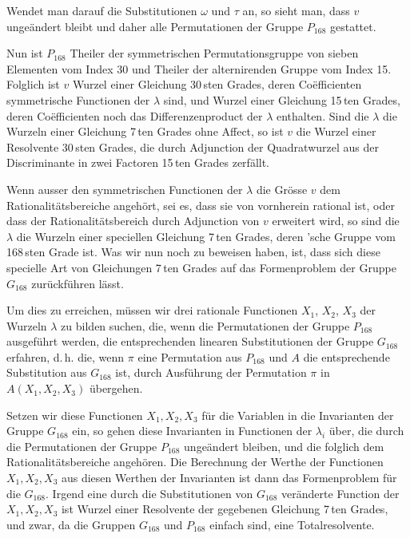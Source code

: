Wendet man darauf die Substitutionen $\omega$ und $\tau$ an, so sieht man, dass $v$ ungeändert bleibt und daher alle Permutationen der Gruppe $P_{168}$ gestattet.

Nun ist $P_{168}$ Theiler der symmetrischen Permutationsgruppe von sieben Elementen vom Index 30 und Theiler der alterniren\-den Gruppe vom Index 15. Folglich ist $v$ Wurzel einer Gleichung 30\,sten Grades, deren Co\"efficienten symmetrische Functionen der $\lambda$ sind, und Wurzel einer Gleichung 15\,ten Grades, deren Co\"efficienten noch das Differenzenproduct der $\lambda$ enthalten. Sind die $\lambda$ die Wurzeln einer Gleichung 7\,ten Grades ohne Affect, so ist $v$ die Wurzel einer Resolvente 30\,sten Grades, die durch Adjunction der Quadratwurzel aus der Discriminante in zwei Factoren 15\,ten Grades zerfällt.

Wenn ausser den symmetrischen Functionen der $\lambda$ die Grösse $v$ dem Rationalitätsbereiche angehört, sei es, dass sie von vornherein rational ist, oder dass der Rationalitätsbereich durch Adjunction von $v$ erweitert wird, so sind die $\lambda$ die Wurzeln einer speciellen Gleichung 7\,ten Grades, deren 'sche Gruppe vom 168\,sten Grade ist. Was wir nun noch zu beweisen haben, ist, dass sich diese specielle Art von Gleichungen 7\,ten Grades auf das Formenproblem der Gruppe $G_{168}$ zurückführen lässt.

Um dies zu erreichen, müssen wir drei rationale Functionen $X_1$, $X_2$, $X_3$ der Wurzeln $\lambda$ zu bilden suchen, die, wenn die Permutationen der Gruppe $P_{168}$ ausgeführt werden, die entsprechenden linearen Substitutionen der Gruppe $G_{168}$ erfahren, d.\,h. die, wenn $\pi$ eine Permutation aus $P_{168}$ und $A$ die entsprechende Substitution aus $G_{168}$ ist, durch Ausführung der Permutation $\pi$ in $A(X_1, X_2, X_3)$ übergehen.

Setzen wir diese Functionen $X_1, X_2, X_3$ für die Variablen in die Invarianten der Gruppe $G_{168}$ ein, so gehen diese Invarianten in Functionen der $\lambda_i$ über, die durch die Permutationen der Gruppe $P_{168}$ ungeändert bleiben, und die folglich dem Rationalitätsbereiche angehören. Die Berechnung der Werthe der Functionen $X_1, X_2, X_3$ aus diesen Werthen der Invarianten ist dann das Formenproblem für die $G_{168}$. Irgend eine durch die Substitutionen von $G_{168}$ veränderte Function der $X_1, X_2, X_3$ ist Wurzel einer Resolvente der gegebenen Gleichung 7\,ten Grades, und zwar, da die Gruppen $G_{168}$ und $P_{168}$ einfach sind, eine Totalresolvente.

